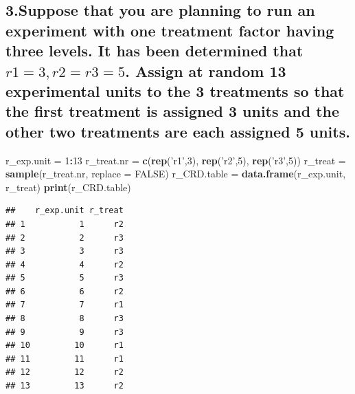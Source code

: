 \documentclass[
]{article}
\newenvironment{Shaded}{\begin{snugshade}}{\end{snugshade}}
\newcommand{\DataTypeTok}[1]{\textcolor[rgb]{0.13,0.29,0.53}{#1}}
\newcommand{\DecValTok}[1]{\textcolor[rgb]{0.00,0.00,0.81}{#1}}
\newcommand{\KeywordTok}[1]{\textcolor[rgb]{0.13,0.29,0.53}{\textbf{#1}}}
\newcommand{\NormalTok}[1]{#1}
\newcommand{\OperatorTok}[1]{\textcolor[rgb]{0.81,0.36,0.00}{\textbf{#1}}}
\newcommand{\OtherTok}[1]{\textcolor[rgb]{0.56,0.35,0.01}{#1}}
\newcommand{\StringTok}[1]{\textcolor[rgb]{0.31,0.60,0.02}{#1}}
\begin{document}
\hypertarget{suppose-that-you-are-planning-to-run-an-experiment-with-one-treatment-factor-having-three-levels.-it-has-been-determined-that-r1-3r2r3-5.-assign-at-random-13-experimental-units-to-the-3-treatments-so-that-the-first-treatment-is-assigned-3-units-and-the-other-two-treatments-are-each-assigned-5-units.}{%
\subsection{\texorpdfstring{3.Suppose that you are planning to run an
experiment with one treatment factor having three levels. It has been
determined that \(r1= 3,r2=r3= 5\). Assign at random 13 experimental
units to the 3 treatments so that the first treatment is assigned 3
units and the other two treatments are each assigned 5
units.}{3.Suppose that you are planning to run an experiment with one treatment factor having three levels. It has been determined that r1= 3,r2=r3= 5. Assign at random 13 experimental units to the 3 treatments so that the first treatment is assigned 3 units and the other two treatments are each assigned 5 units.}}\label{suppose-that-you-are-planning-to-run-an-experiment-with-one-treatment-factor-having-three-levels.-it-has-been-determined-that-r1-3r2r3-5.-assign-at-random-13-experimental-units-to-the-3-treatments-so-that-the-first-treatment-is-assigned-3-units-and-the-other-two-treatments-are-each-assigned-5-units.}}

\begin{Shaded}
\begin{Highlighting}[]
\NormalTok{r_exp.unit =}\StringTok{ }\DecValTok{1}\OperatorTok{:}\DecValTok{13}
\NormalTok{r_treat.nr =}\StringTok{ }\KeywordTok{c}\NormalTok{(}\KeywordTok{rep}\NormalTok{(}\StringTok{'r1'}\NormalTok{,}\DecValTok{3}\NormalTok{), }\KeywordTok{rep}\NormalTok{(}\StringTok{'r2'}\NormalTok{,}\DecValTok{5}\NormalTok{), }\KeywordTok{rep}\NormalTok{(}\StringTok{'r3'}\NormalTok{,}\DecValTok{5}\NormalTok{))}
\NormalTok{r_treat =}\StringTok{ }\KeywordTok{sample}\NormalTok{(r_treat.nr, }\DataTypeTok{replace =} \OtherTok{FALSE}\NormalTok{)}
\NormalTok{r_CRD.table =}\StringTok{ }\KeywordTok{data.frame}\NormalTok{(r_exp.unit, r_treat)}
\KeywordTok{print}\NormalTok{(r_CRD.table)}
\end{Highlighting}
\end{Shaded}

\begin{verbatim}
##    r_exp.unit r_treat
## 1           1      r2
## 2           2      r3
## 3           3      r3
## 4           4      r2
## 5           5      r3
## 6           6      r2
## 7           7      r1
## 8           8      r3
## 9           9      r3
## 10         10      r1
## 11         11      r1
## 12         12      r2
## 13         13      r2
\end{verbatim}
\end{document}
